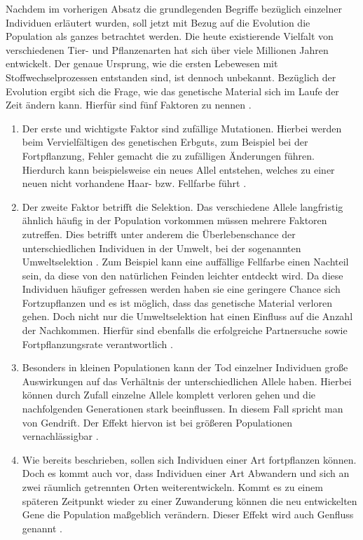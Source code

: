 Nachdem im vorherigen Absatz die grundlegenden Begriffe bezüglich einzelner Individuen erläutert wurden, soll jetzt mit Bezug auf die Evolution die Population als ganzes betrachtet werden. Die heute existierende Vielfalt von verschiedenen Tier- und Pflanzenarten hat sich über viele Millionen Jahren entwickelt. Der genaue Ursprung, wie die ersten Lebewesen mit Stoffwechselprozessen entstanden sind, ist dennoch unbekannt. Bezüglich der Evolution ergibt sich die Frage, wie das genetische Material sich im Laufe der Zeit ändern kann. Hierfür sind fünf Faktoren zu nennen \cite{weicker2015evolutionare}.
\begin{enumerate}
	\item Der erste und wichtigste Faktor sind zufällige Mutationen. Hierbei werden beim Vervielfältigen des genetischen Erbguts, zum Beispiel bei der Fortpflanzung, Fehler gemacht die zu zufälligen Änderungen führen. Hierdurch kann beispielsweise ein neues Allel entstehen, welches zu einer neuen nicht vorhandene Haar- bzw. Fellfarbe führt \cite{weicker2015evolutionare}. 
	
	\item Der zweite Faktor betrifft die Selektion. Das verschiedene Allele langfristig ähnlich häufig in der Population vorkommen müssen mehrere Faktoren zutreffen. Dies betrifft unter anderem die Überlebenschance der unterschiedlichen Individuen in der Umwelt, bei der sogenannten Umweltselektion \cite{weicker2015evolutionare}. Zum Beispiel kann eine auffällige Fellfarbe einen Nachteil sein, da diese von den natürlichen Feinden leichter entdeckt wird. Da diese Individuen häufiger gefressen werden haben sie eine geringere Chance sich Fortzupflanzen und es ist möglich, dass das genetische Material verloren gehen. Doch nicht nur die Umweltselektion hat einen Einfluss auf die Anzahl der Nachkommen. Hierfür sind ebenfalls die erfolgreiche Partnersuche sowie Fortpflanzungsrate verantwortlich \cite{weicker2015evolutionare}.
	
	\item Besonders in kleinen Populationen kann der Tod einzelner Individuen große Auswirkungen auf das Verhältnis der unterschiedlichen Allele haben. Hierbei können durch Zufall einzelne Allele komplett verloren gehen und die nachfolgenden Generationen stark beeinflussen. In diesem Fall spricht man von Gendrift. Der Effekt hiervon ist bei größeren Populationen vernachlässigbar \cite{weicker2015evolutionare}.
	
	\item Wie bereits beschrieben, sollen sich Individuen einer Art fortpflanzen können. Doch es kommt auch vor, dass Individuen einer Art Abwandern und sich an zwei räumlich getrennten Orten weiterentwickeln. Kommt es zu einem späteren Zeitpunkt wieder zu einer Zuwanderung können die neu entwickelten Gene die Population maßgeblich verändern. Dieser Effekt wird auch Genfluss genannt \cite{weicker2015evolutionare}.
	

\end{enumerate}
